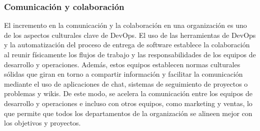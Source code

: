 \subsubsection{Comunicación y colaboración}

El incremento en la comunicación y la colaboración en una organización es uno de los aspectos culturales clave de DevOps. El uso de las herramientas de DevOps y la automatización del proceso de entrega de software establece la colaboración al reunir físicamente los flujos de trabajo y las responsabilidades de los equipos de desarrollo y operaciones. Además, estos equipos establecen normas culturales sólidas que giran en torno a compartir información y facilitar la comunicación mediante el uso de aplicaciones de chat, sistemas de seguimiento de proyectos o problemas y wikis. De este modo, se acelera la comunicación entre los equipos de desarrollo y operaciones e incluso con otros equipos, como marketing y ventas, lo que permite que todos los departamentos de la organización se alineen mejor con los objetivos y proyectos.



